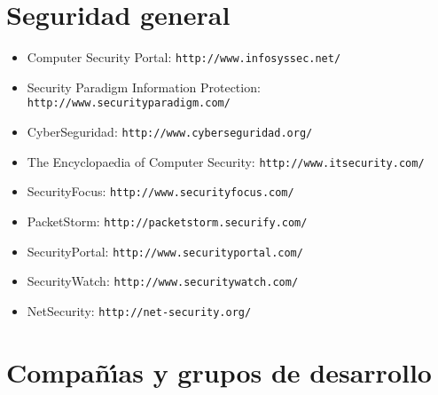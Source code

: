 \section{Seguridad general}
\begin{itemize}
\item Computer Security Portal: {\tt http://www.infosyssec.net/}
\item Security Paradigm Information Protection: {\tt http://www.securityparadigm.com/}
\item CyberSeguridad: {\tt http://www.cyberseguridad.org/}
\item The Encyclopaedia of Computer Security: {\tt http://www.itsecurity.com/}
\item SecurityFocus: {\tt http://www.securityfocus.com/}
\item PacketStorm: {\tt http://packetstorm.securify.com/}
\item SecurityPortal: {\tt http://www.securityportal.com/}
\item SecurityWatch: {\tt http://www.securitywatch.com/}
\item NetSecurity: {\tt http://net-security.org/}
\end{itemize}
\section{Compa\~n\'{\i}as y grupos de desarrollo}
